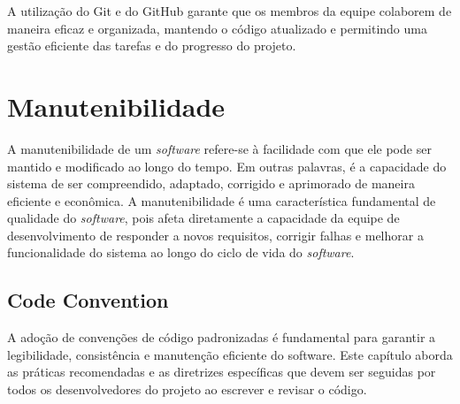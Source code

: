  A utilização do Git e do GitHub garante que os membros da equipe colaborem de maneira eficaz e organizada, mantendo o código atualizado e permitindo uma gestão eficiente das tarefas e do progresso do projeto.

\section{Manutenibilidade}

A manutenibilidade de um \textit{software} refere-se à facilidade com que ele pode ser mantido e modificado ao longo do tempo. Em outras palavras, é a capacidade do sistema de ser compreendido, adaptado, corrigido e aprimorado de maneira eficiente e econômica. A manutenibilidade é uma característica fundamental de qualidade do \textit{software}, pois afeta diretamente a capacidade da equipe de desenvolvimento de responder a novos requisitos, corrigir falhas e melhorar a funcionalidade do sistema ao longo do ciclo de vida do \textit{software}.

\subsection{Code Convention}
A adoção de convenções de código padronizadas é fundamental para garantir a legibilidade, consistência e manutenção eficiente do software. Este capítulo aborda as práticas recomendadas e as diretrizes específicas que devem ser seguidas por todos os desenvolvedores do projeto ao escrever e revisar o código.

